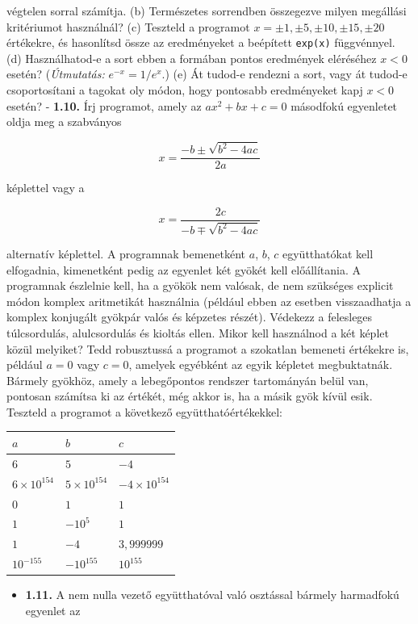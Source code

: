 \documentclass[
  magyar,
  11pt]{article}
\providecommand{\tightlist}{%
  \setlength{\itemsep}{0pt}\setlength{\parskip}{0pt}}
\begin{document}
végtelen sorral számítja. (b) Természetes sorrendben összegezve milyen
megállási kritériumot használnál? (c) Teszteld a programot
\(x = \pm 1, \pm 5, \pm 10, \pm 15, \pm 20\) értékekre, és hasonlítsd
össze az eredményeket a beépített \texttt{exp(x)} függvénnyel. (d)
Használhatod-e a sort ebben a formában pontos eredmények eléréséhez
\(x < 0\) esetén? (\emph{Útmutatás:} \(e^{-x} = 1/e^x\).) (e) Át tudod-e
rendezni a sort, vagy át tudod-e csoportosítani a tagokat oly módon,
hogy pontosabb eredményeket kapj \(x < 0\) esetén? - \textbf{1.10.} Írj
programot, amely az \(ax^2 + bx + c = 0\) másodfokú egyenletet oldja meg
a szabványos

\[x = \frac{-b \pm \sqrt{b^2 - 4ac}}{2a}\]

képlettel vagy a

\[x = \frac{2c}{-b \mp \sqrt{b^2 - 4ac}}\]

alternatív képlettel. A programnak bemenetként \(a\), \(b\), \(c\)
együtthatókat kell elfogadnia, kimenetként pedig az egyenlet két gyökét
kell előállítania. A programnak észlelnie kell, ha a gyökök nem valósak,
de nem szükséges explicit módon komplex aritmetikát használnia (például
ebben az esetben visszaadhatja a komplex konjugált gyökpár valós és
képzetes részét). Védekezz a felesleges túlcsordulás, alulcsordulás és
kioltás ellen. Mikor kell használnod a két képlet közül melyiket? Tedd
robusztussá a programot a szokatlan bemeneti értékekre is, például
\(a = 0\) vagy \(c = 0\), amelyek egyébként az egyik képletet
megbuktatnák. Bármely gyökhöz, amely a lebegőpontos rendszer tartományán
belül van, pontosan számítsa ki az értékét, még akkor is, ha a másik
gyök kívül esik. Teszteld a programot a következő együtthatóértékekkel:

\begin{longtable}[]{@{}lll@{}}
\toprule\noalign{}
\(a\) & \(b\) & \(c\) \\
\midrule\noalign{}
\endhead
\bottomrule\noalign{}
\endlastfoot
\(6\) & \(5\) & \(-4\) \\
\(6 \times 10^{154}\) & \(5 \times 10^{154}\) &
\(-4 \times 10^{154}\) \\
\(0\) & \(1\) & \(1\) \\
\(1\) & \(-10^5\) & \(1\) \\
\(1\) & \(-4\) & \(3{,}999999\) \\
\(10^{-155}\) & \(-10^{155}\) & \(10^{155}\) \\
\end{longtable}

\begin{itemize}
\tightlist
\item
  \textbf{1.11.} A nem nulla vezető együtthatóval való osztással bármely
  harmadfokú egyenlet az
\end{itemize}
\end{document}
